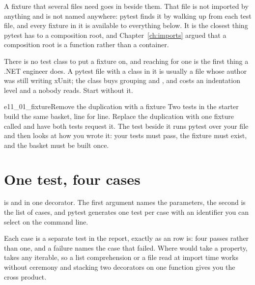 \noindent
A fixture that several files need goes in  beside them.
That file is not imported by anything and is not named anywhere: pytest
finds it by walking up from each test file, and every fixture in it is
available to everything below. It is the closest thing pytest has to a
composition root, and Chapter~\ref{ch:imports} argued that a composition
root is a function rather than a container.

\begin{trapbox}
There is no test class to put a fixture on, and reaching for one is the
first thing a .NET engineer does. A pytest file with a class in it is
usually a file whose author was still writing xUnit; the class buys grouping
and , and costs an indentation level and a 
nobody reads. Start without it.
\end{trapbox}

\begin{exercise}{e11_01_fixture}{Remove the duplication with a fixture}
Two tests in the starter build the same basket, line for line. Replace the
duplication with one fixture called  and have both tests
request it. The test beside it runs pytest over your file and then looks at
how you wrote it: your tests must pass, the fixture must exist, and the
basket must be built once.
\end{exercise}

\section{One test, four cases}
\label{sec:testing-parametrize}

 is \code{[Theory]} and \code{[InlineData]} in one
decorator. The first argument names the parameters, the second is the list
of cases, and pytest generates one test per case with an identifier you can
select on the command line.


\begin{csbox}
Each case is a separate test in the report, exactly as an
\code{[InlineData]} row is: four passes rather than one, and a failure names
the case that failed. Where \code{[MemberData]} would take a property,
 takes any iterable, so a list comprehension or a file read
at import time works without ceremony \dash{} and stacking two
 decorators on one function gives you the cross product.
\end{csbox}

